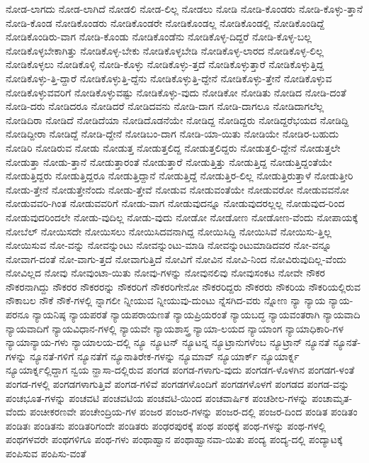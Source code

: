 {ನೋಡ-ಲಾಗದು
ನೋಡ-ಲಾಗಿದೆ
ನೋಡಲಿ
ನೋಡ-ಲಿಲ್ಲ
ನೋಡಲು
ನೋಡಿ
ನೋಡಿ-ಕೊಂಡರು
ನೋಡಿ-ಕೊಳ್ಳು-ತ್ತಾನೆ
ನೋಡಿ-ಕೊಂಡ
ನೋಡಿಕೊಂಡರು
ನೋಡಿಕೊಂಡರೇ
ನೋಡಿಕೊಂಡಲ್ಲ
ನೋಡಿಕೊಂಡಲ್ಲಿ
ನೋಡಿಕೊಂಡಿದ್ದೆ
ನೋಡಿಕೊಂಡಿರು-ವಾಗ
ನೋಡಿ-ಕೊಂಡು
ನೋಡಿಕೊಂಡೆನು
ನೋಡಿಕೊಳ್ಳ-ದಿದ್ದರೆ
ನೋಡಿ-ಕೊಳ್ಳ-ಬಲ್ಲ
ನೋಡಿಕೊಳ್ಳಬೇಕಾಗಿತ್ತು
ನೋಡಿಕೊಳ್ಳ-ಬೇಕು
ನೋಡಿಕೊಳ್ಳಬೇಡಿ
ನೋಡಿಕೊಳ್ಳ-ಲಾರದ
ನೋಡಿಕೊಳ್ಳ-ಲಿಲ್ಲ
ನೋಡಿಕೊಳ್ಳಲು
ನೋಡಿಕೊಳ್ಳಿ
ನೋಡಿ-ಕೊಳ್ಳು
ನೋಡಿಕೊಳ್ಳು-ತ್ತದೆ
ನೋಡಿಕೊಳ್ಳುತ್ತಾರೆ
ನೋಡಿಕೊಳ್ಳುತ್ತಿದ್ದ
ನೋಡಿಕೊಳ್ಳು-ತ್ತಿ-ದ್ದಾರೆ
ನೋಡಿಕೊಳ್ಳುತ್ತಿ-ದ್ದೆನು
ನೋಡಿಕೊಳ್ಳುತ್ತಿ-ದ್ದೇನೆ
ನೋಡಿಕೊಳ್ಳು-ತ್ತೇನೆ
ನೋಡಿಕೊಳ್ಳುವ
ನೋಡಿಕೊಳ್ಳುವವರಿಗೆ
ನೋಡಿಕೊಳ್ಳುವಷ್ಟು
ನೋಡಿಕೊಳ್ಳು-ವುದು
ನೋಡಿಕೋ
ನೋಡಿತು
ನೋಡಿದ
ನೋಡಿ-ದಂತೆ
ನೋಡಿ-ದರು
ನೋಡಿದರೂ
ನೋಡಿದರೆ
ನೋಡಿದವನು
ನೋಡಿ-ದಾಗ
ನೋಡಿ-ದಾಗಲೂ
ನೋಡಿದಾಗಲೆಲ್ಲ
ನೋಡಿದಿರಾ
ನೋಡಿದೆ
ನೋಡಿದೆಯಾ
ನೋಡಿದೊಡನೆಯೇ
ನೋಡಿದ್ದ
ನೋಡಿದ್ದರು
ನೋಡಿದ್ದರೆಭಯದ
ನೋಡಿದ್ದಿ
ನೋಡಿದ್ದೀರಾ
ನೋಡಿದ್ದೆ
ನೋಡಿ-ದ್ದೇನೆ
ನೋಡಿಬಂ-ದಾಗ
ನೋಡಿ-ಯಾ-ಯಿತು
ನೋಡಿಯೇ
ನೋಡಿರ-ಬಹುದು
ನೋಡಿರಿ
ನೋಡಿರುವ
ನೋಡು
ನೋಡುತ್ತ
ನೋಡುತ್ತಲಿದ್ದ
ನೋಡುತ್ತಲಿದ್ದರು
ನೋಡುತ್ತಲಿ-ದ್ದೇನೆ
ನೋಡುತ್ತಲೇ
ನೋಡುತ್ತಾ
ನೋಡು-ತ್ತಾನೆ
ನೋಡುತ್ತಾರಂತೆ
ನೋಡುತ್ತಾರೆ
ನೋಡುತ್ತಿತ್ತು
ನೋಡುತ್ತಿದ್ದ
ನೋಡುತ್ತಿದ್ದಂತೆಯೇ
ನೋಡುತ್ತಿದ್ದರು
ನೋಡುತ್ತಿದ್ದರೂ
ನೋಡುತ್ತಿದ್ದಾನೆ
ನೋಡುತ್ತಿದ್ದೆ
ನೋಡುತ್ತಿರ-ಲಿಲ್ಲ
ನೋಡುತ್ತಿರುತ್ತಾಳೆ
ನೋಡುತ್ತೀರಿ
ನೋಡು-ತ್ತೇನೆ
ನೋಡುತ್ತೇನೆಂದು
ನೋಡು-ತ್ತೇವೆ
ನೋಡುವ
ನೋಡುವಂತೆಯೇ
ನೋಡುವರೋ
ನೋಡುವವನೋ
ನೋಡುವವರಿ-ಗಿಂತ
ನೋಡುವವರಿಗೆ
ನೋಡು-ವಾಗ
ನೋಡುವುದನ್ನೂ
ನೋಡುವುದರಲ್ಲಲ್ಲ
ನೋಡುವುದ-ರಿಂದ
ನೋಡುವುದರಿಂದಲೇ
ನೋಡು-ವುದಿಲ್ಲ
ನೋಡು-ವುದು
ನೋಡೋ
ನೋಡೋಣ
ನೋಡೋಣ-ವೆಂದು
ನೋಪಾಯಕ್ಕೆ
ನೋಬೆಲ್
ನೋಯಿಸದೇ
ನೋಯಿಸಲು
ನೋಯಿಸಿದವನಾಗಿದ್ದ
ನೋಯಿಸಿದ್ದಿ
ನೋಯಿಸಿವೆ
ನೋಯಿಸು-ತ್ತಿಲ್ಲ
ನೋಯಿಸುವ
ನೋ-ವನ್ನು
ನೋವನ್ನುಂಟು
ನೋವನ್ನುಂಟು-ಮಾಡಿ
ನೋವನ್ನುಂಟುಮಾಡಿದವರ
ನೋ-ವನ್ನೂ
ನೋವಾಗ-ದಂತೆ
ನೋ-ವಾಗು-ತ್ತದೆ
ನೋವಾಗುತ್ತಿದೆ
ನೋವಿಗೆ
ನೋವಿನ
ನೋವಿ-ನಿಂದ
ನೋವಿರುವುದಿಲ್ಲ-ವೆಂದು
ನೋವಿಲ್ಲದ
ನೋವು
ನೋವುಂಟಾ-ಯಿತು
ನೋವು-ಗಳನ್ನು
ನೋವುನಲಿವು
ನೋವುಸಂಕಟ
ನೋವೇ
ನೌಕರ
ನೌಕರನಾಗಿದ್ದು
ನೌಕರರ
ನೌಕರರನ್ನು
ನೌಕರರಿಗೆ
ನೌಕರರಿಗೇನೋ
ನೌಕರರಿದ್ದರು
ನೌಕರರು
ನೌಕರಿಯ
ನೌಕರಿಯಲ್ಲಿರುವ
ನೌಕಾಬಲ
ನೌಕೆ
ನೌಕೆ-ಗಳಲ್ಲಿ
ನ್ನಾಗಲೀ
ನ್ನೀಯುವ
ನ್ನೀಯುವು-ದುಂಟು
ನ್ನೆಸಗಿದ-ವರು
ನ್ನೋಣ
ನ್ಯಾ
ನ್ಯಾಯ
ನ್ಯಾಯ-ಪರನೂ
ನ್ಯಾಯನಿಷ್ಠ
ನ್ಯಾಯಪರತೆ
ನ್ಯಾಯಪರಾಯಣತೆ
ನ್ಯಾಯಪ್ರಿಯರಂತೆ
ನ್ಯಾಯಬದ್ಧ
ನ್ಯಾಯವಂತರಾಗಿ
ನ್ಯಾಯವಾದಿ
ನ್ಯಾಯವಾದಿಗೆ
ನ್ಯಾಯವಿಧಾನ-ಗಳಲ್ಲಿ
ನ್ಯಾಯವೇ
ನ್ಯಾಯಶಾಸ್ತ್ರ
ನ್ಯಾಯಾ-ಲಯದ
ನ್ಯಾಯಾಂಗ
ನ್ಯಾಯಾಧಿಕಾರಿ-ಗಳ
ನ್ಯಾಯಾನ್ಯಾಯ-ಗಳು
ನ್ಯಾಯಾಲಯ-ದಲ್ಲಿ
ನ್ಯೂ
ನ್ಯೂಟನ್
ನ್ಯೂಟನ್ನ
ನ್ಯೂಟ್ರಾನುಗಳೆಂಬ
ನ್ಯೂಟ್ರಾನ್
ನ್ಯೂನತೆ
ನ್ಯೂನತೆ-ಗಳನ್ನು
ನ್ಯೂನತೆ-ಗಳಿಗೆ
ನ್ಯೂನತೆಗೆ
ನ್ಯೂನಾತಿರೇಕ-ಗಳನ್ನು
ನ್ಯೂಮಾವ್
ನ್ಯೂಯಾರ್ಕ್
ನ್ಯೂಯಾರ್ಕ್ನ
ನ್ಯೂಯಾರ್ಕ್ನಲ್ಲಿದ್ದಾಗ
ನ್ವಯ
ನ್ಹಾಸಾ-ದಲ್ಲಿರುವ
ಪಂಗಡ
ಪಂಗಡ-ಗಳಾಗು-ವುದು
ಪಂಗಡಗ-ಳೊಳಗಿನ
ಪಂಗಡಗ-ಳಂತೆ
ಪಂಗಡ-ಗಳಲ್ಲಿ
ಪಂಗಡಗಳಾಗುತ್ತಿವೆ
ಪಂಗಡ-ಗಳಿವೆ
ಪಂಗಡಗಳೊಂದಿಗೆ
ಪಂಗಡಗಳೊಳಗೆ
ಪಂಗಡದ
ಪಂಗಡ-ವನ್ನು
ಪಂಚಭೂತ-ಗಳನ್ನು
ಪಂಚವಟಿ
ಪಂಚವಟಿಯ
ಪಂಚವಟಿ-ಯಿಂದ
ಪಂಚವಾರ್ಷಿಕ
ಪಂಚಶೀಲ-ಗಳನ್ನು
ಪಂಚಾಮೃತ-ವೆಂದು
ಪಂಚೀಕರಣವೇ
ಪಂಚೇಂದ್ರಿಯ-ಗಳ
ಪಂಜರ
ಪಂಜರ-ಗಳನ್ನು
ಪಂಜರ-ದಲ್ಲಿ
ಪಂಜರ-ದಿಂದ
ಪಂಡಿತ
ಪಂಡಿತಂ
ಪಂಡಿತಃ
ಪಂಡಿತನು
ಪಂಡಿತರಿಗಂದೇ
ಪಂಡಿತರು
ಪಂಢರಪುರಕ್ಕೆ
ಪಂಥ
ಪಂಥಕ್ಕೆ
ಪಂಥ-ಗಳನ್ನು
ಪಂಥ-ಗಳಲ್ಲಿ
ಪಂಥಗಳವರೇ
ಪಂಥಗಳಿಗೂ
ಪಂಥ-ಗಳು
ಪಂಥಾಹ್ವಾನ
ಪಂಥಾಹ್ವಾನವಾ-ಯಿತು
ಪಂದ್ಯ
ಪಂದ್ಯ-ದಲ್ಲಿ
ಪಂದ್ಯಾಟಕ್ಕೆ
ಪಂಪಿಸುವ
ಪಂಪಿಸು-ವಂತೆ
}
